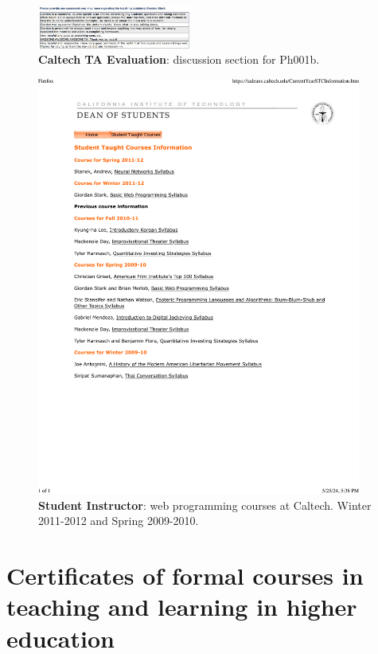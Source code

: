 \begin{figure}[h!]
	\centering
	\caption{\textbf{Caltech TA Evaluation}: discussion section for Ph001b.}
	\includegraphics[width=0.45\textwidth]{attachments/E-teaching/2010_Ph1}
\end{figure}

\begin{figure}[h!]
	\centering
	\caption{\textbf{Student Instructor}: web programming courses at Caltech. Winter 2011-2012 and Spring 2009-2010.}
	\includegraphics[width=0.95\textwidth]{attachments/E-teaching/studentTaughtCourses.htm}
\end{figure}

\section{Certificates of formal courses in teaching and learning in higher education \noneyet} \label{sec:certificates-of-formal-courses-in-teaching-and-learning-in-higher-education-noneyet}
